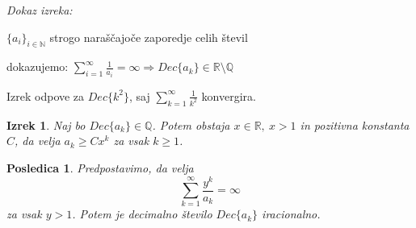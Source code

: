 \documentclass{beamer}
\def\N{\mathbb{N}} %
\def\Q{\mathbb{Q}} %
\def\R{\mathbb{R}} %
\newtheorem{izrek}{Izrek}
\newtheorem{posledica}{Posledica}
\begin{document}
\begin{frame}
    \emph{Dokaz izreka:}
    
    $\{a_i\}_{i \in \N}$ strogo naraščajoče zaporedje celih števil
    
    dokazujemo: $\sum_{i=1}^{\infty} \frac{1}{a_i} = \infty \Rightarrow Dec\{a_k\} \in \R \setminus\Q$
    \newline
    \newline
    \newline
    \newline
    \newline
    \newline
    \newline
    \newline
    \newline
    \newline
    \newline
    \newline
    \newline
    \newline
    \newline
    \newline
\end{frame}

\begin{frame}

    Izrek odpove za $Dec\{k^2\}$, saj $\sum_{k=1}^{\infty}\frac{1}{k^2}$ konvergira.
    \pause

    \begin{izrek}
        Naj bo $Dec\{a_k\} \in \Q$. Potem obstaja $x \in \R, \ x > 1$ in pozitivna konstanta $C$,
        da velja $a_k \geq Cx^k$ za vsak $k \geq 1$.
    \end{izrek}
    \pause


    \begin{posledica}\label{posledica}
        Predpostavimo, da velja
        \[
            \sum_{k=1}^{\infty}\frac{y^k}{a_k} = \infty\]
        za vsak $y > 1$. Potem je decimalno število $Dec\{a_k\}$ iracionalno.
    \end{posledica}

\end{frame}
\end{document}
